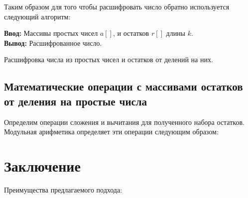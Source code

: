 \documentclass[10pt]{article}
\begin{document}
Таким образом для того чтобы расшифровать число обратно используется следующий алгоритм:

\begin{algorithm}[H]
	\textbf{Ввод:} Массивы простых чисел $a[]$, и остатков $r[]$ длины $k$.\\
	\textbf{Вывод:} Расшифрованное число.
	\begin{algorithmic}
	\end{algorithmic}
	\caption{Расшифровка числа из простых чисел и остатков от делений на них.}
	\label{algo:crt_decription}
\end{algorithm}


\subsection{Математические операции с массивами остатков от деления на простые числа}

Определим операции сложения и вычитания для полученного набора остатков. Модульная арифметика \cite{omondi2007residue, soderstrand1986residue} определяет эти операции следующим образом: 


\section{Заключение}

Преимущества предлагаемого подхода:
\end{document}
